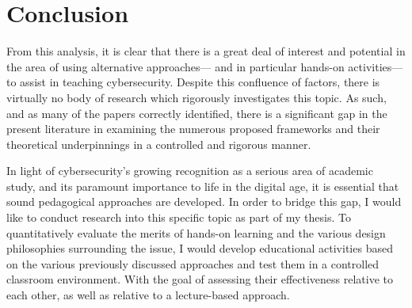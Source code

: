 \section{Conclusion}

    From this analysis, it is clear that there is a great deal of interest and potential in the area of using alternative approaches---%
and in particular hands-on activities---%
to assist in teaching cybersecurity. %
Despite this confluence of factors, there is virtually no body of research which rigorously investigates this topic. %
As such, and as many of the papers correctly identified, there is a significant gap in the present literature in examining the numerous proposed frameworks and their theoretical underpinnings in a controlled and rigorous manner. 

    In light of cybersecurity's growing recognition as a serious area of academic study, and its paramount importance to life in the digital age, it is essential that sound pedagogical approaches are developed. %
In order to bridge this gap, I would like to conduct research into this specific topic as part of my thesis. %
To quantitatively evaluate the merits of hands-on learning and the various design philosophies surrounding the issue, I would develop educational activities based on the various previously discussed approaches and test them in a controlled classroom environment. %
With the goal of assessing their effectiveness relative to each other, as well as relative to a lecture-based approach. 
